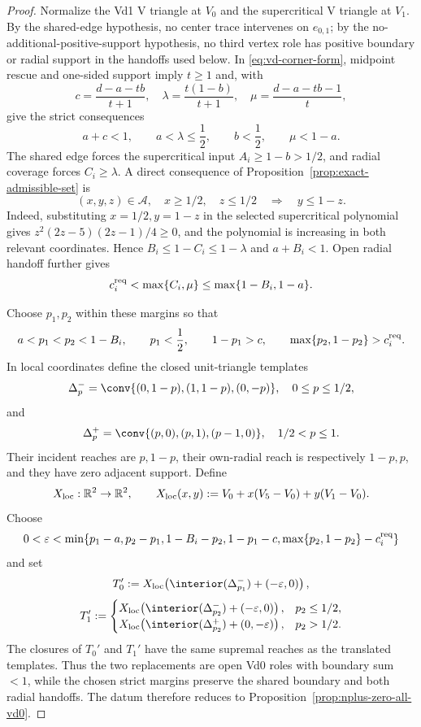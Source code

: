 \begin{proof}
Normalize the Vd1 V triangle at $V_0$ and the supercritical V triangle at $V_1$.
By the shared-edge hypothesis, no center trace intervenes on $e_{0,1}$;
by the no-additional-positive-support hypothesis, no third vertex role has
positive boundary or radial support in the handoffs used below.
In \eqref{eq:vd-corner-form}, midpoint rescue and one-sided support imply
$t\ge1$ and, with
\[
 c=\frac{d-a-tb}{t+1},\quad
 \lambda=\frac{t(1-b)}{t+1},\quad
 \mu=\frac{d-a-tb-1}{t},
\]
give the strict consequences
\begin{equation}
 a+c<1,\qquad a<\lambda\le\frac12,\qquad
 b<\frac12,\qquad \mu<1-a.
 \label{eq:replacement-margins}
\end{equation}
The shared edge forces the supercritical input $A_i\ge1-b>1/2$, and radial
coverage forces $C_i\ge\lambda$.  A direct consequence of
Proposition~\ref{prop:exact-admissible-set} is
\[
 (x,y,z)\in\mathcal A,\quad x\ge1/2,\quad z\le1/2
 \quad\Longrightarrow\quad y\le1-z.
\]
Indeed, substituting $x=1/2,y=1-z$ in the selected supercritical polynomial
gives $z^2(2z-5)(2z-1)/4\ge0$, and the polynomial is increasing in both
relevant coordinates.  Hence $B_i\le1-C_i\le1-\lambda$ and
$a+B_i<1$.  Open radial handoff further gives
\[
 c_i^{\rm req}<\max\{C_i,\mu\}
 \le\max\{1-B_i,1-a\}.
\]

Choose $p_1,p_2$ within these margins so that
\[
 a<p_1<p_2<1-B_i,\qquad
 p_1<\frac12,\qquad
 1-p_1>c,\qquad
 \max\{p_2,1-p_2\}>c_i^{\rm req}.
\]
In local coordinates define the closed unit-triangle templates
\[
 \Delta_p^-=\conv\{(0,1-p),(1,1-p),(0,-p)\},
 \quad 0\le p\le1/2,
\]
and
\[
 \Delta_p^+=\conv\{(p,0),(p,1),(p-1,0)\},
 \quad 1/2<p\le1.
\]
Their incident reaches are $p,1-p$, their own-radial reach is respectively
$1-p,p$, and they have zero adjacent support.  Define
\[
 X_{\rm loc}:\mathbb R^2\to\mathbb R^2,\qquad
 X_{\rm loc}(x,y):=V_0+x(V_5-V_0)+y(V_1-V_0).
\]
Choose
\[
 0<\varepsilon<
 \min\{p_1-a, p_2-p_1, 1-B_i-p_2,
 1-p_1-c, \max\{p_2,1-p_2\}-c_i^{\rm req}\}
\]
and set
\[
 T_0':=
 X_{\rm loc}\!\left(\interior(\Delta_{p_1}^-)+(-\varepsilon,0)\right),
\]
\[
 T_1':=
 \begin{cases}
 X_{\rm loc}\!\left(\interior(\Delta_{p_2}^-)
 +(-\varepsilon,0)\right),&p_2\le1/2,\\
 X_{\rm loc}\!\left(\interior(\Delta_{p_2}^+)
 +(0,-\varepsilon)\right),&p_2>1/2.
 \end{cases}
\]
The closures of $T_0'$ and $T_1'$ have the same supremal reaches as the
translated templates.  Thus the two replacements are open Vd0 roles with
boundary sum $<1$, while the chosen strict margins preserve the shared
boundary and both radial handoffs.  The datum therefore reduces to
Proposition~\ref{prop:nplus-zero-all-vd0}.
\end{proof}

